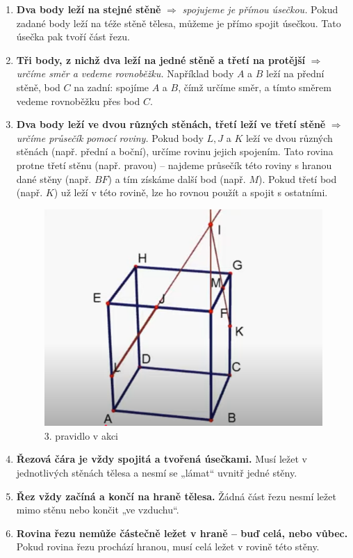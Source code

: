 \begin{enumerate}
    \item \textbf{Dva body leží na stejné stěně} $\Rightarrow$ \emph{spojujeme je přímou úsečkou.}  
    Pokud zadané body leží na téže stěně tělesa, můžeme je přímo spojit úsečkou. Tato úsečka pak tvoří část řezu.

    \item \textbf{Tři body, z nichž dva leží na jedné stěně a třetí na protější} $\Rightarrow$ \emph{určíme směr a vedeme rovnoběžku.}  
    Například body $A$ a $B$ leží na přední stěně, bod $C$ na zadní: spojíme $A$ a $B$, čímž určíme směr, a tímto směrem vedeme rovnoběžku přes bod $C$.

    \item \textbf{Dva body leží ve dvou různých stěnách, třetí leží ve třetí stěně} $\Rightarrow$ \emph{určíme průsečík pomocí roviny.}  
    Pokud body $L,J$ a $K$ leží ve dvou různých stěnách (např. přední a boční), určíme rovinu jejich spojením. Tato rovina protne třetí stěnu (např. pravou) – najdeme průsečík této roviny s hranou dané stěny (např. $BF$) a tím získáme další bod (např. $M$). Pokud třetí bod (např. $K$) už leží v této rovině, lze ho rovnou použít a spojit s ostatními.

    \begin{figure}
        \centering
        \includegraphics[width=0.5\linewidth]{img/16_objemy_rez.png}
        \caption{3. pravidlo v akci}
    \end{figure}

    \item \textbf{Řezová čára je vždy spojitá a tvořená úsečkami.}  
    Musí ležet v jednotlivých stěnách tělesa a nesmí se „lámat“ uvnitř jedné stěny.

    \item \textbf{Řez vždy začíná a končí na hraně tělesa.}  
    Žádná část řezu nesmí ležet mimo stěnu nebo končit „ve vzduchu“.

    \item \textbf{Rovina řezu nemůže částečně ležet v hraně – buď celá, nebo vůbec.}  
    Pokud rovina řezu prochází hranou, musí celá ležet v rovině této stěny.
\end{enumerate}
